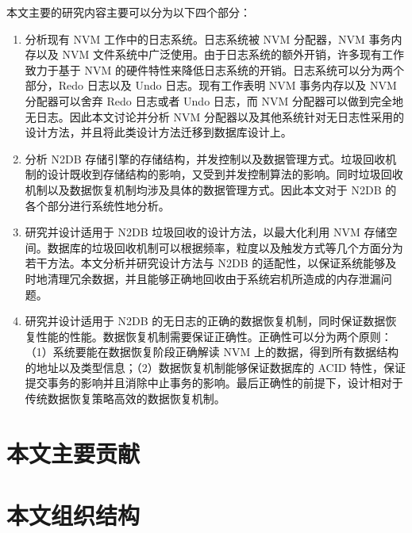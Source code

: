 本文主要的研究内容主要可以分为以下四个部分：
\begin{enumerate}
    \item 分析现有 NVM 工作中的日志系统。日志系统被 NVM 分配器，NVM 事务内存以及 NVM 文件系统中广泛使用。由于日志系统的额外开销，许多现有工作致力于基于 NVM 的硬件特性来降低日志系统的开销。日志系统可以分为两个部分，Redo 日志以及 Undo 日志。现有工作表明 NVM 事务内存以及 NVM 分配器可以舍弃 Redo 日志或者 Undo 日志，而 NVM 分配器可以做到完全地无日志。因此本文讨论并分析 NVM 分配器以及其他系统针对无日志性采用的设计方法，并且将此类设计方法迁移到数据库设计上。
    \item 分析 N2DB 存储引擎的存储结构，并发控制以及数据管理方式。垃圾回收机制的设计既收到存储结构的影响，又受到并发控制算法的影响。同时垃圾回收机制以及数据恢复机制均涉及具体的数据管理方式。因此本文对于 N2DB 的各个部分进行系统性地分析。
    \item 研究并设计适用于 N2DB 垃圾回收的设计方法，以最大化利用 NVM 存储空间。数据库的垃圾回收机制可以根据频率，粒度以及触发方式等几个方面分为若干方法。本文分析并研究设计方法与 N2DB 的适配性，以保证系统能够及时地清理冗余数据，并且能够正确地回收由于系统宕机所造成的内存泄漏问题。
    \item 研究并设计适用于 N2DB 的无日志的正确的数据恢复机制，同时保证数据恢复性能的性能。数据恢复机制需要保证正确性。正确性可以分为两个原则：（1）系统要能在数据恢复阶段正确解读 NVM 上的数据，得到所有数据结构的地址以及类型信息；（2）数据恢复机制能够保证数据库的 ACID 特性，保证提交事务的影响并且消除中止事务的影响。最后正确性的前提下，设计相对于传统数据恢复策略高效的数据恢复机制。
\end{enumerate}

\section{本文主要贡献}




\section{本文组织结构}

